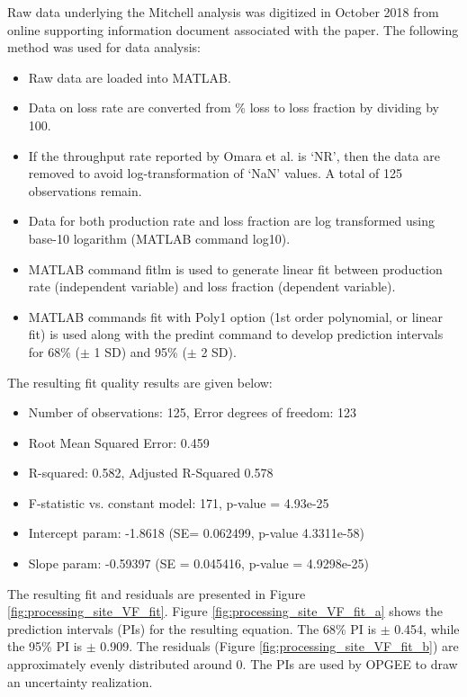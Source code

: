 \documentclass[11pt]{report}
\newcommand{\prm}[1]{\textsf{#1}}
\begin{document}
Raw data underlying the Mitchell analysis was digitized in October 2018 from online supporting information document associated with the paper. The following method was used for data analysis:
\begin{itemize}
\item Raw data are loaded into MATLAB.
\item Data on loss rate are converted from \% loss to loss fraction by dividing by 100.
\item If the throughput rate reported by Omara et al. is `NR', then the data are removed to avoid log-transformation of `NaN' values. A total of 125 observations remain. 
\item Data for both production rate and loss fraction are log transformed using base-10 logarithm (MATLAB command \prm{log10}).
\item MATLAB command \prm{fitlm} is used to generate linear fit between production rate (independent variable) and loss fraction (dependent variable). 
\item MATLAB commands \prm{fit} with \prm{Poly1} option (1st order polynomial, or linear fit) is used along with the \prm{predint} command to develop prediction intervals for 68\% ($\pm$ 1 SD) and 95\% ($\pm$ 2 SD).
\end{itemize} 

The resulting fit quality results are given below:
\begin{itemize}
\item Number of observations: 125, Error degrees of freedom: 123
\item Root Mean Squared Error: 0.459
\item R-squared: 0.582,  Adjusted R-Squared 0.578
\item F-statistic vs. constant model: 171, p-value = 4.93e-25
\item Intercept param: -1.8618   (SE= 0.062499, p-value 4.3311e-58)
\item Slope param: -0.59397    (SE = 0.045416, p-value = 4.9298e-25)
\end{itemize}

The resulting fit and residuals are presented in Figure \ref{fig:processing_site_VF_fit}. Figure \ref{fig:processing_site_VF_fit_a} shows the prediction intervals (PIs) for the resulting equation. The 68\% PI is $\pm$ 0.454, while the 95\% PI is $\pm$ 0.909. The residuals (Figure \ref{fig:processing_site_VF_fit_b}) are approximately evenly distributed around 0. The PIs are used by OPGEE to draw an uncertainty realization.
\end{document}
